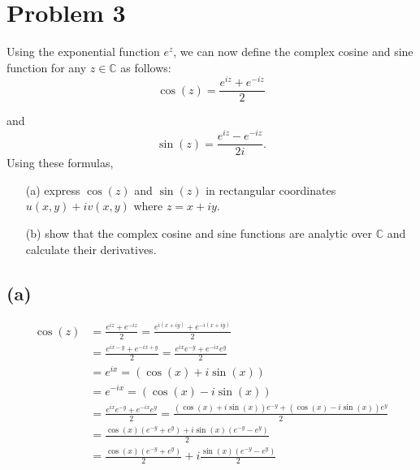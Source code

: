 \documentclass{article}
\begin{document}
\newpage
\section*{Problem 3}
Using the exponential function $e^{z}$, we can now define the complex cosine and sine function for any $z \in \mathbb{C}$ as follows:
\[  \cos(z) = \frac{e^{iz} + e^{-iz}}{2} \]

and
\[  \sin(z) = \frac{e^{iz} - e^{-iz}}{2i}. \]
Using these formulas,
\begin{enumerate}
	\item[(a)] express $\cos(z)$ and $\sin(z)$ in rectangular coordinates $u(x,y) + iv (x,y)$ where $z = x + iy$.
	\item[(b)] show that the complex cosine and sine functions are analytic over $\mathbb{C}$ and calculate their derivatives.
\end{enumerate}

\subsection*{(a)}
\begin{align*}
  \cos{(z)} &= \frac{e^{iz} + e^{-iz}}{2}  = \frac{e^{i(x+iy)} + e^{-i(x+iy)}}{2} \\
          &= \frac{e^{ix-y} + e^{-ix+y}}{2} = \frac{e^{ix}e^{-y} + e^{-ix}e^{y}}{2} \\
          &= e^{ix} = (\cos{(x)} + i\sin{(x)}) \\
          &= e^{-ix} = (\cos{(x)} - i\sin{(x)}) \\
          &= \frac{e^{ix}e^{-y} + e^{-ix}e^{y}}{2} = \frac{(\cos{(x)} + i\sin{(x)})e^{-y} + (\cos{(x)} - i\sin{(x)})e^{y}}{2} \\
  &= \frac{\cos{(x)}(e^{-y} + e^{y}) + i\sin{(x)}(e^{-y}- e^{y})}{2} \\
  &= \frac{\cos{(x)}(e^{-y} + e^{y})}{2} + i\frac{\sin{(x)}(e^{-y}- e^{y})}{2} \\
\end{align*}
\end{document}
